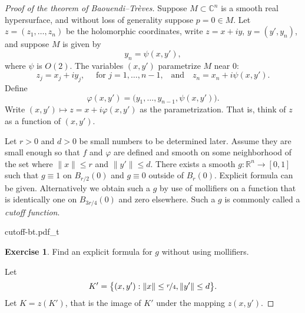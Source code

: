 \documentclass[12pt,openany]{book}
\newcommand{\snorm}[1]{\lVert {#1} \rVert}
\newcommand{\C}{{\mathbb{C}}}
\newcommand{\R}{{\mathbb{R}}}
\newcommand{\myindex}[1]{#1\index{#1}}
\theoremstyle{plain}
\theoremstyle{remark}
\theoremstyle{definition}
\newenvironment{exbox}{%
    \def\FrameCommand{\vrule width 1pt \relax\hspace{10pt}}%
    \MakeFramed {\advance \hsize -\width \FrameRestore}%
}{%
    \endMakeFramed
}
\newenvironment{myfig}{%
    \begin{center}
}{%
    \end{center}
}
\theoremstyle{exercise}
\newtheorem{exercise}{Exercise}[section]
\theoremstyle{example}
\begin{document}
\begin{proof}[Proof of the theorem of Baouendi--Tr{\`e}ves]
Suppose $M \subset \C^n$ is a smooth real hypersurface, and without loss
of generality suppose $p=0 \in M$.
Let $z=(z_1,\ldots,z_n)$ be the holomorphic coordinates, write $z=x+iy$,
$y=(y',y_n)$, and
suppose $M$ is given by
\begin{equation*}
y_n = \psi(x,y') ,
\end{equation*}
where $\psi$ is $O(2)$.
The variables $(x,y')$ parametrize $M$ near 0:
\begin{equation*}
z_j = x_j+iy_j , \quad \text{ for $j = 1,\ldots,n-1$,} \quad \text{and} \quad
z_n = x_n + i \psi(x,y') .
\end{equation*}
Define
\begin{equation*}
\varphi(x,y') = \bigl(y_1,\ldots,y_{n-1},\psi(x,y')\bigr) .
\end{equation*}
Write $(x,y') \mapsto z = x + i\varphi(x,y')$ as the parametrization.
That is, think of $z$ as a function of $(x,y')$.

Let $r > 0$ and $d > 0$ be small numbers to be determined later.
Assume they are small enough so
that $f$ and $\varphi$ are defined and smooth on some neighborhood of the
set where $\snorm{x} \leq r$ and $\snorm{y'} \leq d$.
There exists a smooth $g \colon \R^n \to [0,1]$ such that $g \equiv 1$ on
$B_{r/2}(0)$ and $g \equiv 0$ outside of $B_{r}(0)$.  Explicit formula
can be given.  Alternatively we obtain such a $g$ by use of
mollifiers on a function that is identically one on
$B_{3r/4}(0)$ and zero elsewhere.  Such a $g$ is commonly called a
\emph{\myindex{cutoff function}}.

\begin{myfig}
{cutoff-bt.pdf_t}
\end{myfig}

\begin{exbox}
\begin{exercise}
Find an explicit formula for $g$ without using mollifiers.
\end{exercise}
\end{exbox}

Let
\begin{equation*}
K' = \bigl\{ (x,y') : \snorm{x} \leq \nicefrac{r}{4} , \snorm{y'} \leq d
\bigr\} .
\end{equation*}
Let $K = z(K')$, that is the image of $K'$ under the mapping $z(x,y')$.


\end{proof}
\end{document}
